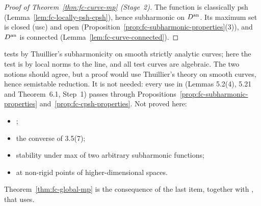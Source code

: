 \begin{proof}[Proof of Theorem~\ref{thm:fc-curve-mp} (Stage~2)]
The function is classically psh (Lemma~\ref{lem:fc-locally-psh-cpsh}), hence subharmonic on $D^{\mathrm{an}}$. Its maximum set is
closed (usc) and open (Proposition~\ref{prop:fc-subharmonic-properties}(3)), and $D^{\mathrm{an}}$ is connected
(Lemma~\ref{lem:fc-curve-connected}).
\end{proof}

\begin{remark}\label{rmk:fc-gr25}
\cite[Definition~3.4]{GR25} tests by Thuillier's subharmonicity on smooth strictly analytic curves; here the test is
by local norms to the line, and all test curves are algebraic. The two notions should agree, but a proof would use
Thuillier's theory on smooth curves, hence semistable reduction. It is not needed: every use in \cite{FHX} (Lemmas
5.2(4), 5.21 and Theorem~6.1, Step~1) passes through
Propositions~\ref{prop:fc-subharmonic-properties} and~\ref{prop:fc-cpsh-properties}. Not proved here:
\begin{itemize}
\item \cite[Prop.~3.5(3),(9)]{GR25};
\item the converse of 3.5(7);
\item stability under max of two arbitrary subharmonic functions;
\item \cite[Theorem~6.1]{GR25} at non-rigid points of higher-dimensional spaces.
\end{itemize}
Theorem~\ref{thm:fc-global-mp} is the consequence of the last item, together with \cite[3.4.8]{Berkovich90}, that
\cite{FHX} uses.
\end{remark}
